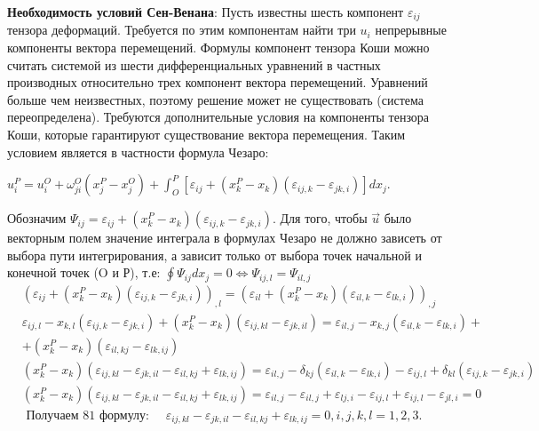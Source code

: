 \textbf{Необходимость условий Сен-Венана}:
Пусть известны шесть компонент $\varepsilon_{ij}$ тензора деформаций. Требуется по этим компонентам найти три $u_{i}$
непрерывные компоненты вектора перемещений. Формулы компонент тензора Коши можно считать
системой из шести дифференциальных уравнений в частных производных относительно трех компонент
вектора перемещений. Уравнений больше чем неизвестных, поэтому решение может не существовать
(система переопределена). Требуются дополнительные условия на компоненты тензора Коши, которые
гарантируют существование вектора перемещения. Таким условием является в частности формула Чезаро:


$ \displaystyle
u_i^P=u_i^O+\omega_{j i}^O\left(x_j^P-x_j^O\right)+\int_O^P\left[\varepsilon_{i j}+\left(x_k^P-x_k\right)\left(\varepsilon_{i j, k}-\varepsilon_{j k, i}\right)\right] d x_j.
$


 Обозначим $\Psi_{i j}=\varepsilon_{i j}+\left(x_k^P-x_k\right)\left(\varepsilon_{i j, k}-\varepsilon_{j k, i}\right)$. Для того, чтобы $\vec{u}$ было векторным полем значение интеграла в формулах Чезаро не должно зависеть от выбора пути интегрирования, а зависит только от выбора точек начальной и конечной точек (O и Р), т.е: $\oint \Psi_{i j} d x_j=0 \Leftrightarrow \Psi_{i j, l}=\Psi_{i l,j}$
$$
\begin{aligned}
& \left(\varepsilon_{i j}+\left(x_k^P-x_k\right)\left(\varepsilon_{i j, k}-\varepsilon_{j k, i}\right)\right)_{, l}=\left(\varepsilon_{i l}+\left(x_k^P-x_k\right)\left(\varepsilon_{i l, k}-\varepsilon_{l k, i}\right)\right)_{, j} \\
& \varepsilon_{i j, l}-x_{k, l}\left(\varepsilon_{i j, k}-\varepsilon_{j k, i}\right)+\left(x_k^P-x_k\right)\left(\varepsilon_{i j, k l}-\varepsilon_{j k, i l}\right)=\varepsilon_{i l, j}-x_{k, j}\left(\varepsilon_{i l, k}-\varepsilon_{l k, i}\right)+ \\ & +\left(x_k^P-x_k\right)\left(\varepsilon_{i l, k j}-\varepsilon_{l k, i j}\right) \\
& \left(x_k^P-x_k\right)\left(\varepsilon_{i j, k l}-\varepsilon_{j k, i l}-\varepsilon_{i l, k j}+\varepsilon_{l k, i j}\right)=\varepsilon_{i l, j}-\delta_{k j}\left(\varepsilon_{i l, k}-\varepsilon_{l k, i}\right)-\varepsilon_{i j, l}+\delta_{k l}\left(\varepsilon_{i j, k}-\varepsilon_{j k, i}\right) \\
& \left(x_k^P-x_k\right)\left(\varepsilon_{i j, k l}-\varepsilon_{j k, i l}-\varepsilon_{i l, k j}+\varepsilon_{l k, i j}\right)=\varepsilon_{i l, j}-\varepsilon_{i l, j}+\varepsilon_{l j, i}-\varepsilon_{i j, l}+\varepsilon_{i j, l}-\varepsilon_{j l, i}=0 \\
& \text { Получаем } 81 \text { формулу: } \quad \varepsilon_{i j, k l}-\varepsilon_{j k, i l}-\varepsilon_{i l, k j}+\varepsilon_{l k, i j}=0, i, j, k, l=1,2,3.
\end{aligned}
$$


